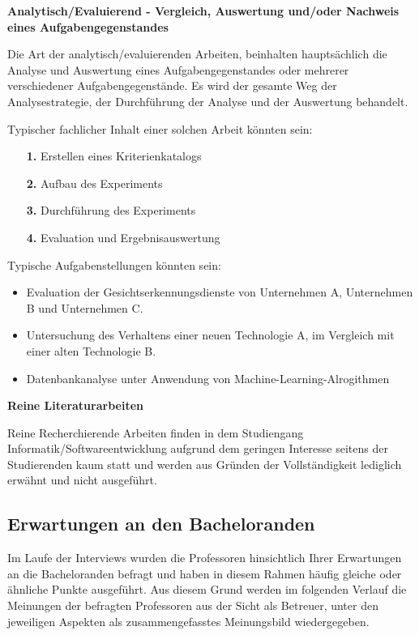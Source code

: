 \documentclass[bibliography=totoc,listof=totoc,BCOR=5mm,DIV=12,oneside]{scrbook}
\begin{document}
\newpage
\par \bigskip \textbf{Analytisch/Evaluierend - Vergleich, Auswertung und/oder Nachweis eines Aufgabengegenstandes}
\par \medskip Die Art der analytisch/evaluierenden Arbeiten, beinhalten hauptsächlich die Analyse und Auswertung eines Aufgabengegenstandes oder mehrerer verschiedener Aufgabengegenstände. Es wird der gesamte Weg der Analysestrategie, der Durchführung der Analyse und der Auswertung behandelt.
\par \medskip Typischer fachlicher Inhalt einer solchen Arbeit könnten sein:
\begin{itemize}
\item[\textbf{1.}] Erstellen eines Kriterienkatalogs
\item[\textbf{2.}] Aufbau des Experiments
\item[\textbf{3.}] Durchführung des Experiments
\item[\textbf{4.}] Evaluation und Ergebnisauswertung
\end{itemize}

\par \medskip Typische Aufgabenstellungen könnten sein:
\begin{itemize}
\item Evaluation der Gesichtserkennungsdienste von Unternehmen A, Unternehmen B und Unternehmen C.
\item Untersuchung des Verhaltens einer neuen Technologie A, im Vergleich mit einer alten Technologie B.
\item Datenbankanalyse unter Anwendung von Machine-Learning-Alrogithmen
\end{itemize}

\par \bigskip \textbf{Reine Literaturarbeiten}
\par Reine Recherchierende Arbeiten finden in dem Studiengang Informatik/Softwareentwicklung aufgrund dem geringen Interesse seitens der Studierenden kaum statt und werden aus Gründen der Vollständigkeit lediglich erwähnt und nicht ausgeführt.

\newpage
\subsection{Erwartungen an den Bacheloranden}
\par Im Laufe der Interviews wurden die Professoren hinsichtlich Ihrer Erwartungen an die Bacheloranden befragt und haben in diesem Rahmen häufig gleiche oder ähnliche Punkte ausgeführt. Aus diesem Grund werden im folgenden Verlauf die Meinungen der befragten Professoren aus der Sicht als Betreuer, unter den jeweiligen Aspekten als zusammengefasstes Meinungsbild wiedergegeben.
\end{document}
